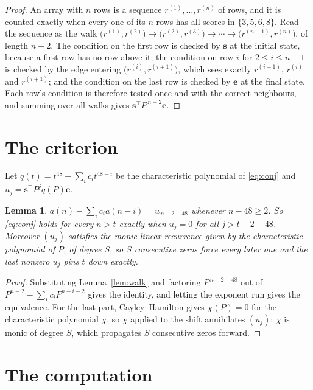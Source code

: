 \documentclass[11pt,a4paper]{article}
\theoremstyle{plain}
\newtheorem{lemma}[theorem]{Lemma}
\theoremstyle{definition}
\begin{document}
\begin{proof}
An array with $n$ rows is a sequence $r^{(1)},\dots,r^{(n)}$ of rows, and it is counted
exactly when every one of its $n$ rows has all scores in $\{3,5,6,8\}$. Read the sequence as the
walk $\bigl(r^{(1)},r^{(2)}\bigr)\to\bigl(r^{(2)},r^{(3)}\bigr)\to\cdots\to
\bigl(r^{(n-1)},r^{(n)}\bigr)$, of length $n-2$. The condition on the first row is
checked by $\mathbf{s}$ at the initial state, because a first row has no row above it; the
condition on row $i$ for $2\le i\le n-1$ is checked by the edge entering
$\bigl(r^{(i)},r^{(i+1)}\bigr)$, which sees exactly $r^{(i-1)}$, $r^{(i)}$ and
$r^{(i+1)}$; and the condition on the last row is checked by $\mathbf{e}$ at the final
state. Each row's condition is therefore tested once and with the correct neighbours, and
summing over all walks gives $\mathbf{s}^{\!\top}P^{\,n-2}\mathbf{e}$.
\end{proof}

\section{The criterion}

Let $q(t)=t^{48}-\sum_i c_i t^{48-i}$ be the characteristic polynomial of
\eqref{eq:conj} and $u_j=\mathbf{s}^{\!\top}P^{j}q(P)\mathbf{e}$.

\begin{lemma}\label{lem:crit}
$a(n)-\sum_i c_i a(n-i)=u_{\,n-2-48}$ whenever $n-48\ge2$. So \eqref{eq:conj}
holds for every $n>t$ exactly when $u_j=0$ for all $j>t-2-48$. Moreover $(u_j)$
satisfies the monic linear recurrence given by the characteristic polynomial of $P$, of
degree $S$, so $S$ consecutive zeros force every later one and the last nonzero $u_j$ pins
$t$ down exactly.
\end{lemma}

\begin{proof}
Substituting Lemma~\ref{lem:walk} and factoring $P^{\,n-2-48}$ out of
$P^{n-2}-\sum_i c_i P^{n-i-2}$ gives the identity, and letting the exponent run gives the
equivalence. For the last part, Cayley--Hamilton gives $\chi(P)=0$ for the characteristic
polynomial $\chi$, so $\chi$ applied to the shift annihilates $(u_j)$; $\chi$ is monic of
degree $S$, which propagates $S$ consecutive zeros forward.
\end{proof}

\section{The computation}
\end{document}
